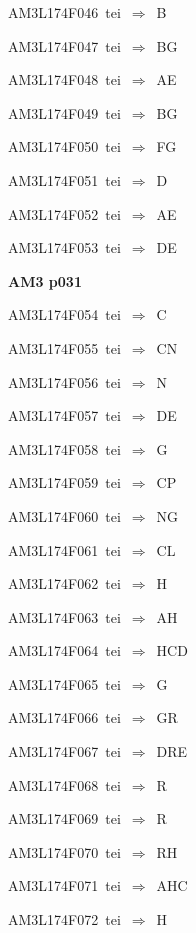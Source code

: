 {\sixrm AM3L174F046\ {\sixit tei}\ }$\Rightarrow$\ B\par\smallskip
{\sixrm AM3L174F047\ {\sixit tei}\ }$\Rightarrow$\ BG\par\smallskip
{\sixrm AM3L174F048\ {\sixit tei}\ }$\Rightarrow$\ AE\par\smallskip
{\sixrm AM3L174F049\ {\sixit tei}\ }$\Rightarrow$\ BG\par\smallskip
{\sixrm AM3L174F050\ {\sixit tei}\ }$\Rightarrow$\ FG\par\smallskip
{\sixrm AM3L174F051\ {\sixit tei}\ }$\Rightarrow$\ D\par\smallskip
{\sixrm AM3L174F052\ {\sixit tei}\ }$\Rightarrow$\ AE\par\smallskip
{\sixrm AM3L174F053\ {\sixit tei}\ }$\Rightarrow$\ DE\par\smallskip

\par\vfill\eject
{\bf\hfill AM3 p031\hfill\hbox{}}\par\bigskip
{\sixrm AM3L174F054\ {\sixit tei}\ }$\Rightarrow$\ C\par\smallskip
{\sixrm AM3L174F055\ {\sixit tei}\ }$\Rightarrow$\ CN\par\smallskip
{\sixrm AM3L174F056\ {\sixit tei}\ }$\Rightarrow$\ N\par\smallskip
{\sixrm AM3L174F057\ {\sixit tei}\ }$\Rightarrow$\ DE\par\smallskip
{\sixrm AM3L174F058\ {\sixit tei}\ }$\Rightarrow$\ G\par\smallskip
{\sixrm AM3L174F059\ {\sixit tei}\ }$\Rightarrow$\ CP\par\smallskip
{\sixrm AM3L174F060\ {\sixit tei}\ }$\Rightarrow$\ NG\par\smallskip
{\sixrm AM3L174F061\ {\sixit tei}\ }$\Rightarrow$\ CL\par\smallskip
{\sixrm AM3L174F062\ {\sixit tei}\ }$\Rightarrow$\ H\par\smallskip
{\sixrm AM3L174F063\ {\sixit tei}\ }$\Rightarrow$\ AH\par\smallskip
{\sixrm AM3L174F064\ {\sixit tei}\ }$\Rightarrow$\ HCD\par\smallskip
{\sixrm AM3L174F065\ {\sixit tei}\ }$\Rightarrow$\ G\par\smallskip
{\sixrm AM3L174F066\ {\sixit tei}\ }$\Rightarrow$\ GR\par\smallskip
{\sixrm AM3L174F067\ {\sixit tei}\ }$\Rightarrow$\ DRE\par\smallskip
{\sixrm AM3L174F068\ {\sixit tei}\ }$\Rightarrow$\ R\par\smallskip
{\sixrm AM3L174F069\ {\sixit tei}\ }$\Rightarrow$\ R\par\smallskip
{\sixrm AM3L174F070\ {\sixit tei}\ }$\Rightarrow$\ RH\par\smallskip
{\sixrm AM3L174F071\ {\sixit tei}\ }$\Rightarrow$\ AHC\par\smallskip
{\sixrm AM3L174F072\ {\sixit tei}\ }$\Rightarrow$\ H\par\smallskip

